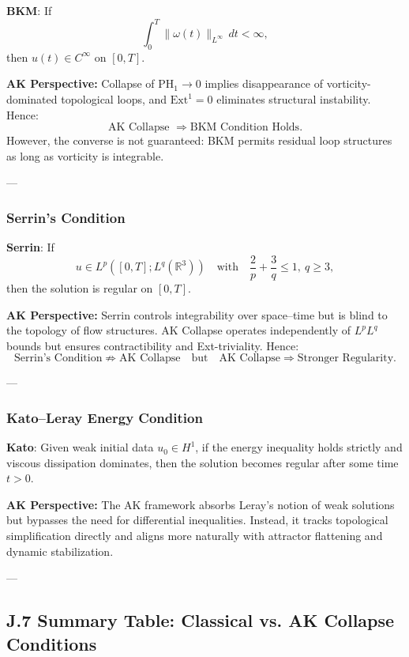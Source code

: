 \documentclass[11pt]{article}
\theoremstyle{definition}
\begin{document}
\textbf{BKM}:  
If
\[
\int_0^T \|\omega(t)\|_{L^\infty} \, dt < \infty,
\]
then \( u(t) \in C^\infty \) on \( [0, T] \).

\textbf{AK Perspective:}  
Collapse of \( \mathrm{PH}_1 \to 0 \) implies disappearance of vorticity-dominated topological loops, and \( \mathrm{Ext}^1 = 0 \) eliminates structural instability.  
Hence:
\[
\text{AK Collapse } \Rightarrow \text{BKM Condition Holds}.
\]
However, the converse is not guaranteed: BKM permits residual loop structures as long as vorticity is integrable.

---

\subsubsection*{Serrin’s Condition}

\textbf{Serrin}:  
If
\[
u \in L^p([0,T]; L^q(\mathbb{R}^3)) \quad \text{with} \quad \frac{2}{p} + \frac{3}{q} \leq 1,\ q \geq 3,
\]
then the solution is regular on \( [0,T] \).

\textbf{AK Perspective:}  
Serrin controls integrability over space–time but is blind to the topology of flow structures.  
AK Collapse operates independently of \( L^pL^q \) bounds but ensures contractibility and Ext-triviality.  
Hence:
\[
\text{Serrin's Condition} \not\Rightarrow \text{AK Collapse} \quad \text{but} \quad \text{AK Collapse} \Rightarrow \text{Stronger Regularity}.
\]

---

\subsubsection*{Kato–Leray Energy Condition}

\textbf{Kato}:  
Given weak initial data \( u_0 \in H^1 \), if the energy inequality holds strictly and viscous dissipation dominates, then the solution becomes regular after some time \( t > 0 \).

\textbf{AK Perspective:}  
The AK framework absorbs Leray’s notion of weak solutions but bypasses the need for differential inequalities.  
Instead, it tracks topological simplification directly and aligns more naturally with attractor flattening and dynamic stabilization.

---

\subsection*{J.7 Summary Table: Classical vs. AK Collapse Conditions}
\end{document}

